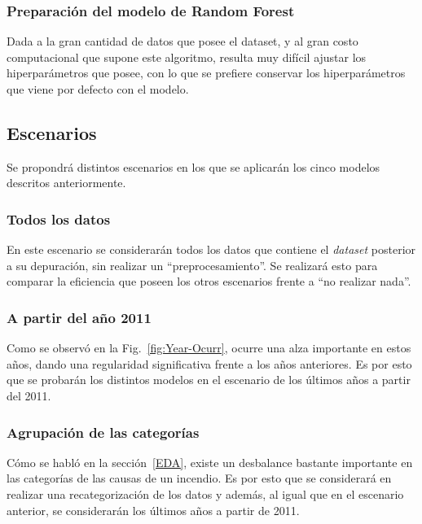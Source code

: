 \subsubsection{Preparación del modelo de Random Forest}
Dada a la gran cantidad de datos que posee el dataset, y al gran costo computacional que supone este algoritmo, resulta muy difícil ajustar los hiperparámetros que posee, con lo que se prefiere conservar los hiperparámetros que viene por defecto con el modelo.



\subsection{Escenarios}
Se propondrá distintos escenarios en los que se aplicarán los cinco modelos descritos anteriormente.

\subsubsection{Todos los datos}
En este escenario se considerarán todos los datos que contiene el \textit{dataset} posterior a su depuración, sin realizar un ``preprocesamiento''. Se realizará esto para comparar la eficiencia que poseen los otros escenarios frente a ``no realizar nada''.

\subsubsection{A partir del año 2011}

Como se observó en la Fig.~\ref{fig:Year-Ocurr}, ocurre una alza importante en estos años, dando una regularidad significativa frente a los años anteriores. Es por esto que se probarán los distintos modelos en el escenario de los últimos años a partir del 2011.

\subsubsection{Agrupación de las categorías}
Cómo se habló en la sección~\ref{EDA}, existe un desbalance bastante importante en las categorías de las causas de un incendio. Es por esto que se considerará en realizar una recategorización de los datos y además, al igual que en el escenario anterior, se considerarán los últimos años a partir de 2011.

